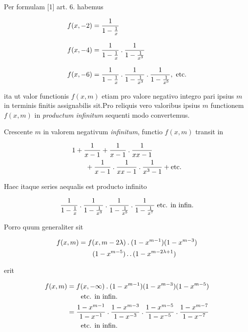 Per formulam [1] art. 6. habemus

\[
\begin{aligned}
f(x,-2)&=\frac{1}{1-\frac1x}\\[8pt]
f(x,-4)&=\frac{1}{1-\frac1x}\pdot\frac{1}{1-\frac1{x^3}}\\[8pt]
f(x,-6)&=\frac{1}{1-\frac1x}\pdot\frac{1}{1-\frac1{x^3}}\pdot\frac{1}{1-\frac1{x^5}},\ \text{etc.}
\end{aligned}
\]

ita ut valor functionis $f(x,m)$ etiam pro valore negativo integro pari ipsius $m$ in terminis finitis assignabilis sit.\quad Pro reliquis vero valoribus ipsius $m$ functionem $f(x,m)$ in \emph{productum infinitum} sequenti modo convertemus.

Crescente $m$ in valorem negativum \emph{infinitum}, functio $f(x,m)$ transit in

%
\[
\begin{aligned}
&1+\frac1{x-1}+\frac1{x-1}\mathbin{.}\frac1{xx-1}\\
&\qquad+\frac1{x-1}\mathbin{.}\frac1{xx-1}\mathbin{.}\frac1{x^3-1}+\text{etc.}
\end{aligned}
\]

Haec itaque series aequalis est producto infinito

\[
\begin{aligned}
\frac1{1-\frac1x}\mathbin{.}\frac1{1-\frac1{x^3}}\mathbin{.}\frac1{1-\frac1{x^5}}\mathbin{.}\frac1{1-\frac1{x^7}}\;\text{etc. in infin.}
\end{aligned}
\]

Porro quum generaliter sit

\[
\begin{aligned}
f(x,m)&=f(x,m-2\lambda)\mathbin{.}(1-x^{m-1})(1-x^{m-3})\\
&\qquad(1-x^{m-5})\mathinner{.\,.}(1-x^{m-2\lambda+1})
\end{aligned}
\]

erit

\[
\begin{aligned}
f(x,m)&=f(x,-\infty)\mathbin{.}(1-x^{m-1})(1-x^{m-3})(1-x^{m-5})\\
&\qquad\text{etc. in infin.}\\
&=\frac{1-x^{m-1}}{1-x^{-1}}\mathbin{.}\frac{1-x^{m-3}}{1-x^{-3}}\mathbin{.}\frac{1-x^{m-5}}{1-x^{-5}}\mathbin{.}\frac{1-x^{m-7}}{1-x^{-7}}\\
&\qquad\text{etc. in infin.}
\end{aligned}
\]

